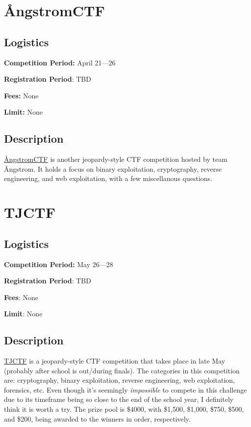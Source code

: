 \documentclass[
  letterpaper,
  DIV=11,
  numbers=noendperiod]{scrartcl}
\begin{document}
\hypertarget{uxe5ngstromctf}{%
\section{ÅngstromCTF}\label{uxe5ngstromctf}}

\hypertarget{logistics-10}{%
\subsection{Logistics}\label{logistics-10}}

\textbf{Competition Period:} April 21---26

\textbf{Registration Period}: TBD

\textbf{Fees:} None

\textbf{Limit:} None

\hypertarget{description-10}{%
\subsection{Description}\label{description-10}}

\href{https://angstromctf.com/}{ÅngstromCTF} is another jeopardy-style
CTF competition hosted by team Ångstrom. It holds a focus on binary
exploitation, cryptography, reverse engineering, and web exploitation,
with a few miscellanous questions.

\hypertarget{tjctf}{%
\section{TJCTF}\label{tjctf}}

\hypertarget{logistics-11}{%
\subsection{Logistics}\label{logistics-11}}

\textbf{Competition Period:} May 26---28

\textbf{Registration Period}: TBD

\textbf{Fees}: None

\textbf{Limit}: None

\hypertarget{description-11}{%
\subsection{Description}\label{description-11}}

\href{https://tjctf.org/}{TJCTF} is a jeopardy-style CTF competition
that takes place in late May (probably after school is out/during
finals). The categories in this competition are: cryptography, binary
exploitation, reverse engineering, web exploitation, forensics, etc.
Even though it's seemingly \emph{impossible} to compete in this
challenge due to its timeframe being so close to the end of the school
year, I definitely think it is worth a try. The prize pool is \$4000,
with \$1,500, \$1,000, \$750, \$500, and \$200, being awarded to the
winners in order, respectively.
\end{document}
